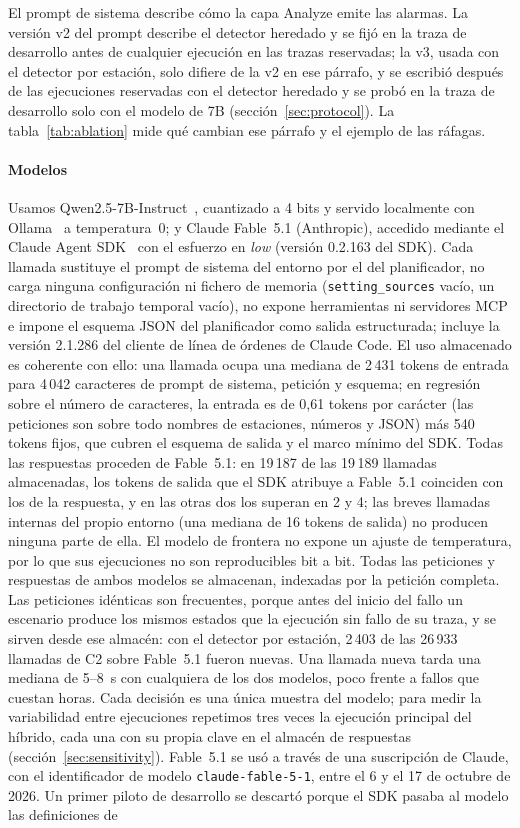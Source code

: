 \documentclass[preprint,11pt]{elsarticle}
\begin{document}
El prompt de sistema describe cómo la capa Analyze emite las alarmas. La versión v2 del prompt describe el detector heredado y se fijó en la traza de desarrollo antes de cualquier ejecución en las trazas reservadas; la v3, usada con el detector por estación, solo difiere de la v2 en ese párrafo, y se escribió después de las ejecuciones reservadas con el detector heredado y se probó en la traza de desarrollo solo con el modelo de 7B (sección~\ref{sec:protocol}). La tabla~\ref{tab:ablation} mide qué cambian ese párrafo y el ejemplo de las ráfagas.

\paragraph{Modelos}
Usamos Qwen2.5-7B-Instruct~\cite{qwen2024}, cuantizado a 4 bits y servido localmente con Ollama~\cite{ollama} a temperatura~0; y Claude Fable~5.1 (Anthropic), accedido mediante el Claude Agent SDK~\cite{anthropic2026agentsdk} con el esfuerzo en \emph{low} (versión 0.2.163 del SDK). Cada llamada sustituye el prompt de sistema del entorno por el del planificador, no carga ninguna configuración ni fichero de memoria (\texttt{setting\_sources} vacío, un directorio de trabajo temporal vacío), no expone herramientas ni servidores MCP e impone el esquema JSON del planificador como salida estructurada; incluye la versión 2.1.286 del cliente de línea de órdenes de Claude Code. El uso almacenado es coherente con ello: una llamada ocupa una mediana de 2\,431 tokens de entrada para 4\,042 caracteres de prompt de sistema, petición y esquema; en regresión sobre el número de caracteres, la entrada es de 0{,}61 tokens por carácter (las peticiones son sobre todo nombres de estaciones, números y JSON) más 540 tokens fijos, que cubren el esquema de salida y el marco mínimo del SDK. Todas las respuestas proceden de Fable~5.1: en 19\,187 de las 19\,189 llamadas almacenadas, los tokens de salida que el SDK atribuye a Fable~5.1 coinciden con los de la respuesta, y en las otras dos los superan en 2 y 4; las breves llamadas internas del propio entorno (una mediana de 16 tokens de salida) no producen ninguna parte de ella. El modelo de frontera no expone un ajuste de temperatura, por lo que sus ejecuciones no son reproducibles bit a bit. Todas las peticiones y respuestas de ambos modelos se almacenan, indexadas por la petición completa. Las peticiones idénticas son frecuentes, porque antes del inicio del fallo un escenario produce los mismos estados que la ejecución sin fallo de su traza, y se sirven desde ese almacén: con el detector por estación, 2\,403 de las 26\,933 llamadas de C2 sobre Fable~5.1 fueron nuevas. Una llamada nueva tarda una mediana de 5--8~s con cualquiera de los dos modelos, poco frente a fallos que cuestan horas. Cada decisión es una única muestra del modelo; para medir la variabilidad entre ejecuciones repetimos tres veces la ejecución principal del híbrido, cada una con su propia clave en el almacén de respuestas (sección~\ref{sec:sensitivity}). Fable~5.1 se usó a través de una suscripción de Claude, con el identificador de modelo \texttt{claude-fable-5-1}, entre el 6 y el 17 de octubre de 2026. Un primer piloto de desarrollo se descartó porque el SDK pasaba al modelo las definiciones de 
\end{document}
